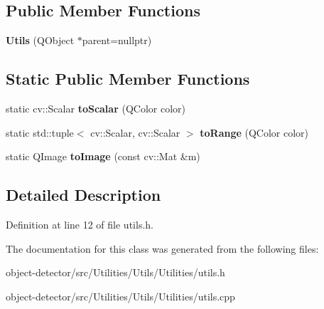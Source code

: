 \subsection*{Public Member Functions}
\begin{DoxyCompactItemize}
\item 
\mbox{\label{class_utilities_1_1_utils_a2485caf868a56ee5a1f6052193fd722c}} 
{\bfseries Utils} (Q\+Object $\ast$parent=nullptr)
\end{DoxyCompactItemize}
\subsection*{Static Public Member Functions}
\begin{DoxyCompactItemize}
\item 
\mbox{\label{class_utilities_1_1_utils_a3e2dc24f6e8bffb572a968015f070e3d}} 
static cv\+::\+Scalar {\bfseries to\+Scalar} (Q\+Color color)
\item 
\mbox{\label{class_utilities_1_1_utils_a8049b798a16e83ac705fa3cda8340c7e}} 
static std\+::tuple$<$ cv\+::\+Scalar, cv\+::\+Scalar $>$ {\bfseries to\+Range} (Q\+Color color)
\item 
\mbox{\label{class_utilities_1_1_utils_ac8c1bcc2dd3d5bda38d1636bd92e5173}} 
static Q\+Image {\bfseries to\+Image} (const cv\+::\+Mat \&m)
\end{DoxyCompactItemize}


\subsection{Detailed Description}


Definition at line 12 of file utils.\+h.



The documentation for this class was generated from the following files\+:\begin{DoxyCompactItemize}
\item 
object-\/detector/src/\+Utilities/\+Utils/\+Utilities/utils.\+h\item 
object-\/detector/src/\+Utilities/\+Utils/\+Utilities/utils.\+cpp\end{DoxyCompactItemize}
